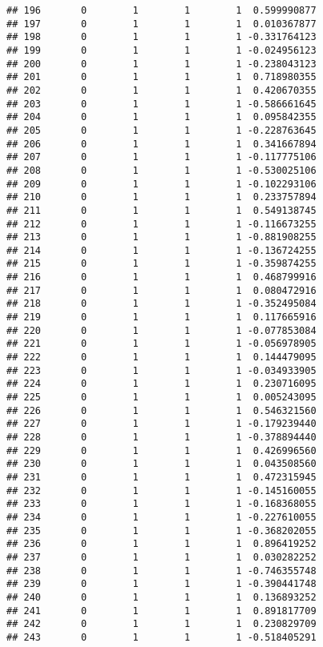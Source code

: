 \documentclass[]{book}
\theoremstyle{definition}
\theoremstyle{definition}
\theoremstyle{definition}
\theoremstyle{remark}
\begin{document}
\begin{verbatim}
## 196       0        1        1        1  0.599990877
## 197       0        1        1        1  0.010367877
## 198       0        1        1        1 -0.331764123
## 199       0        1        1        1 -0.024956123
## 200       0        1        1        1 -0.238043123
## 201       0        1        1        1  0.718980355
## 202       0        1        1        1  0.420670355
## 203       0        1        1        1 -0.586661645
## 204       0        1        1        1  0.095842355
## 205       0        1        1        1 -0.228763645
## 206       0        1        1        1  0.341667894
## 207       0        1        1        1 -0.117775106
## 208       0        1        1        1 -0.530025106
## 209       0        1        1        1 -0.102293106
## 210       0        1        1        1  0.233757894
## 211       0        1        1        1  0.549138745
## 212       0        1        1        1 -0.116673255
## 213       0        1        1        1 -0.881908255
## 214       0        1        1        1 -0.136724255
## 215       0        1        1        1 -0.359874255
## 216       0        1        1        1  0.468799916
## 217       0        1        1        1  0.080472916
## 218       0        1        1        1 -0.352495084
## 219       0        1        1        1  0.117665916
## 220       0        1        1        1 -0.077853084
## 221       0        1        1        1 -0.056978905
## 222       0        1        1        1  0.144479095
## 223       0        1        1        1 -0.034933905
## 224       0        1        1        1  0.230716095
## 225       0        1        1        1  0.005243095
## 226       0        1        1        1  0.546321560
## 227       0        1        1        1 -0.179239440
## 228       0        1        1        1 -0.378894440
## 229       0        1        1        1  0.426996560
## 230       0        1        1        1  0.043508560
## 231       0        1        1        1  0.472315945
## 232       0        1        1        1 -0.145160055
## 233       0        1        1        1 -0.168368055
## 234       0        1        1        1 -0.227610055
## 235       0        1        1        1 -0.368202055
## 236       0        1        1        1  0.896419252
## 237       0        1        1        1  0.030282252
## 238       0        1        1        1 -0.746355748
## 239       0        1        1        1 -0.390441748
## 240       0        1        1        1  0.136893252
## 241       0        1        1        1  0.891817709
## 242       0        1        1        1  0.230829709
## 243       0        1        1        1 -0.518405291

\end{verbatim}
\end{document}
